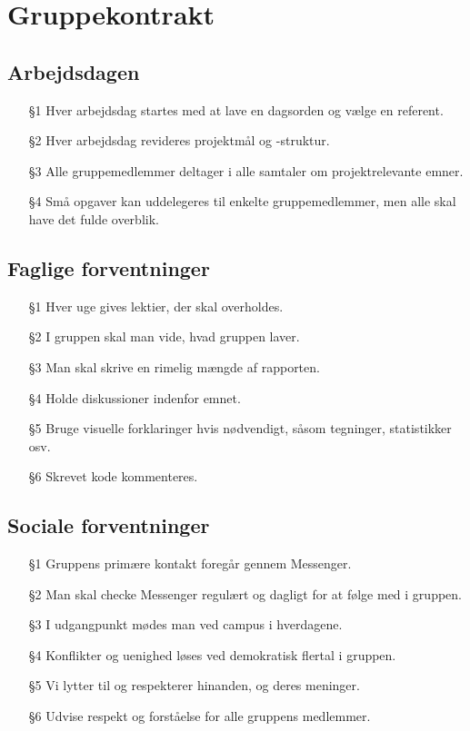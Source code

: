 \section{Gruppekontrakt}\label{app:contract}

\subsection*{Arbejdsdagen}
\begin{itemize}
    \item[§1] Hver arbejdsdag startes med at lave en dagsorden og vælge en referent.
    \item[§2] Hver arbejdsdag revideres projektmål og -struktur.
    \item[§3] Alle gruppemedlemmer deltager i alle samtaler om projektrelevante emner.
    \item[§4] Små opgaver kan uddelegeres til enkelte gruppemedlemmer, men alle skal have det fulde overblik.
\end{itemize}

\subsection*{Faglige forventninger}
\begin{itemize}
    \item[§1] Hver uge gives lektier, der skal overholdes.
    \item[§2] I gruppen skal man vide, hvad gruppen laver.
    \item[§3] Man skal skrive en rimelig mængde af rapporten.
    \item[§4] Holde diskussioner indenfor emnet.
    \item[§5] Bruge visuelle forklaringer hvis nødvendigt, såsom tegninger, statistikker osv.
    \item[§6] Skrevet kode kommenteres.
\end{itemize}

\subsection*{Sociale forventninger}
\begin{itemize}
    \item[§1] Gruppens primære kontakt foregår gennem Messenger.
    \item[§2] Man skal checke Messenger regulært og dagligt for at følge med i gruppen.
    \item[§3] I udgangpunkt mødes man ved campus i hverdagene.
    \item[§4] Konflikter og uenighed løses ved demokratisk flertal i gruppen.
    \item[§5] Vi lytter til og respekterer hinanden, og deres meninger.
    \item[§6] Udvise respekt og forståelse for alle gruppens medlemmer.
\end{itemize}

